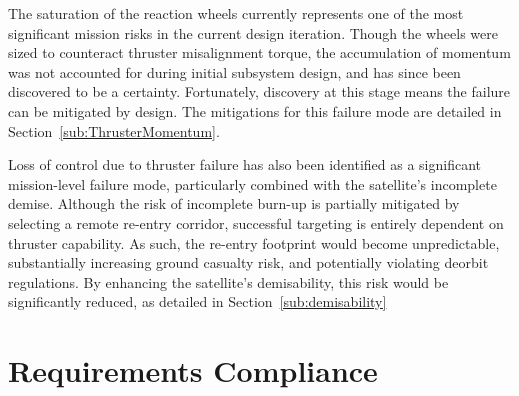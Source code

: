 \documentclass[a4paper, 11pt, conference]{IEEEtran}
\begin{document}
The saturation of the reaction wheels currently represents one of the most significant mission risks in the current design iteration. Though the wheels were sized to counteract thruster misalignment torque, the accumulation of momentum was not accounted for during initial subsystem design, and has since been discovered to be a certainty. Fortunately, discovery at this stage means the failure can be mitigated by design. The mitigations for this failure mode are detailed in Section~\ref{sub:ThrusterMomentum}.

Loss of control due to thruster failure has also been identified as a significant mission-level failure mode, particularly combined with the satellite’s incomplete demise. Although the risk of incomplete burn-up is partially mitigated by selecting a remote re-entry corridor, successful targeting is entirely dependent on thruster capability. As such, the re-entry footprint would become unpredictable, substantially increasing ground casualty risk, and potentially violating deorbit regulations. By enhancing the satellite's demisability, this risk would be significantly reduced, as detailed in Section~\ref{sub:demisability}
\FloatBarrier
\section{Requirements Compliance}
\end{document}
